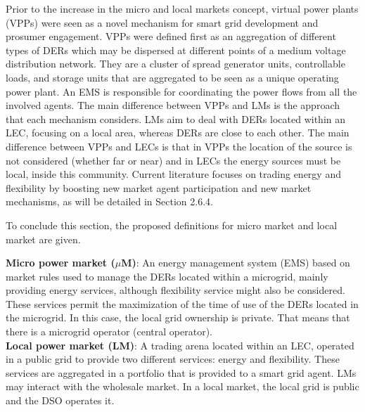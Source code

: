 Prior to the increase in the micro and local markets concept, virtual power plants (VPPs) were seen as a novel mechanism for smart grid development and prosumer engagement. VPPs were defined first as an aggregation of different types of DERs which may be dispersed at different points of a medium voltage distribution network. They are a cluster of spread generator units, controllable loads, and storage units that are aggregated to be seen as a unique operating power plant. An EMS is responsible for coordinating the power flows from all the involved agents. The main difference between VPPs and LMs is the approach that each mechanism considers. LMs aim to deal with DERs located within an LEC, focusing on a local area, whereas DERs are close to each other. The main difference between VPPs and LECs is that in VPPs the location of the source is not considered (whether far or near) and in LECs the energy sources must be local, inside this community. Current literature focuses on trading energy and flexibility by boosting new market agent participation and new market mechanisms, as will be detailed in Section 2.6.4.

To conclude this section, the proposed definitions for micro market and local market are given.

\begin{tcolorbox}
\textbf{Micro power market ($\mu$M)}: An energy management system (EMS) based on market rules used to
manage the DERs located within a microgrid, mainly providing energy services, although flexibility service
might also be considered. These services permit the maximization of the time of use of the DERs located in
the microgrid. In this case, the local grid ownership is private. That means that there is a microgrid operator
(central operator).\\
\newline
\textbf{Local power market (LM)}: A trading arena located within an LEC, operated in a public grid to provide
two different services: energy and flexibility. These services are aggregated in a portfolio that is provided to
a smart grid agent. LMs may interact with the wholesale market.
In a local market, the local grid is public and the DSO operates it.
\end{tcolorbox}

